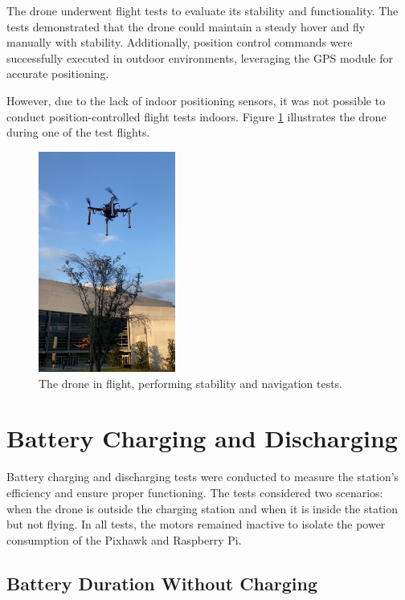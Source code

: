 The drone underwent flight tests to evaluate its stability and functionality. The tests demonstrated that the drone could maintain a steady hover and fly manually with stability. Additionally, position control commands were successfully executed in outdoor environments, leveraging the GPS module for accurate positioning.

However, due to the lack of indoor positioning sensors, it was not possible to conduct position-controlled flight tests indoors. Figure \ref{fig:drone_flight_test} illustrates the drone during one of the test flights.

\begin{figure}[H]
    \centering
    \includegraphics[width=0.4\textwidth]{pictures/drone_volando.jpeg}
    \caption{The drone in flight, performing stability and navigation tests.}
    \label{fig:drone_flight_test}
\end{figure}

\section{Battery Charging and Discharging}

Battery charging and discharging tests were conducted to measure the station's efficiency and ensure proper functioning. The tests considered two scenarios: when the drone is outside the charging station and when it is inside the station but not flying. In all tests, the motors remained inactive to isolate the power consumption of the Pixhawk and Raspberry Pi.

\subsection{Battery Duration Without Charging}


